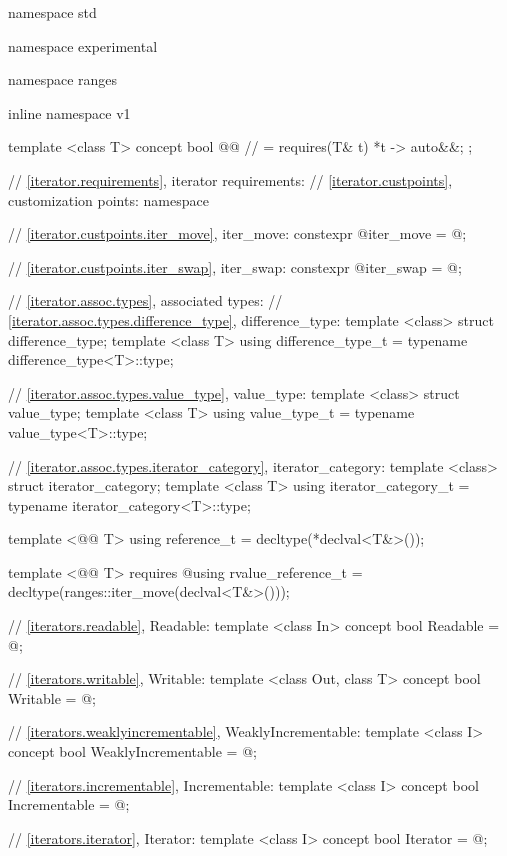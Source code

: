 %
\begin{codeblock}
namespace std { namespace experimental { namespace ranges { inline namespace v1 {
  template <class T> concept bool @@ // \expos
    = requires(T& t) { {*t} -> auto&&; };

  // \ref{iterator.requirements}, iterator requirements:
  // \ref{iterator.custpoints}, customization points:
  namespace {
    // \ref{iterator.custpoints.iter_move}, iter_move:
    constexpr @\unspec@ iter_move = @\unspec@;

    // \ref{iterator.custpoints.iter_swap}, iter_swap:
    constexpr @\unspec@ iter_swap = @\unspec@;
  }

  // \ref{iterator.assoc.types}, associated types:
  // \ref{iterator.assoc.types.difference_type}, difference_type:
  template <class> struct difference_type;
  template <class T> using difference_type_t
    = typename difference_type<T>::type;

  // \ref{iterator.assoc.types.value_type}, value_type:
  template <class> struct value_type;
  template <class T> using value_type_t
    = typename value_type<T>::type;

  // \ref{iterator.assoc.types.iterator_category}, iterator_category:
  template <class> struct iterator_category;
  template <class T> using iterator_category_t
    = typename iterator_category<T>::type;

  template <@@ T> using reference_t
    = decltype(*declval<T&>());

  template <@@ T>
      requires @\seebelow@ using rvalue_reference_t
    = decltype(ranges::iter_move(declval<T&>()));

  // \ref{iterators.readable}, Readable:
  template <class In>
  concept bool Readable = @\seebelow@;

  // \ref{iterators.writable}, Writable:
  template <class Out, class T>
  concept bool Writable = @\seebelow@;

  // \ref{iterators.weaklyincrementable}, WeaklyIncrementable:
  template <class I>
  concept bool WeaklyIncrementable = @\seebelow@;

  // \ref{iterators.incrementable}, Incrementable:
  template <class I>
  concept bool Incrementable = @\seebelow@;

  // \ref{iterators.iterator}, Iterator:
  template <class I>
  concept bool Iterator = @\seebelow@;

}}}}
\end{codeblock}
